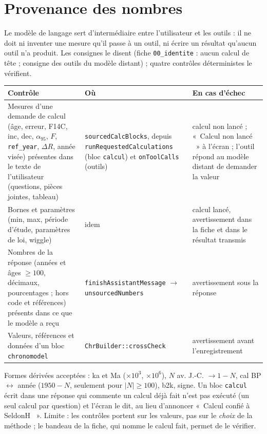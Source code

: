 \documentclass[11pt,a4paper]{article}
\providecommand{\og}{«~}\providecommand{\fg}{\unskip~»}
\newcommand{\code}[1]{\texttt{\small #1}}
\begin{document}
\section{Provenance des nombres}\label{sec:provenance}

Le modèle de langage sert d'intermédiaire entre l'utilisateur et les outils : il ne doit ni inventer une mesure qu'il
passe à un outil, ni écrire un résultat qu'aucun outil n'a produit. Les consignes le disent (fiche \code{00\_identite} :
aucun calcul de tête ; consigne des outils du modèle distant) ; quatre contrôles déterministes le vérifient.

\begin{center}\small
\begin{tabularx}{\linewidth}{@{}>{\raggedright\arraybackslash}p{4.6cm}>{\raggedright\arraybackslash}p{4.4cm}X@{}}
\toprule
\textbf{Contrôle} & \textbf{Où} & \textbf{En cas d'échec}\\
\midrule
Mesures d'une demande de calcul (âge, erreur, F14C, inc, dec, $\alpha_{95}$, $F$, \code{ref\_year}, $\Delta R$, année
visée) présentes dans le texte de l'utilisateur (questions, pièces jointes, tableau)
  & \code{sourcedCalcBlocks}, depuis \code{runRequestedCalculations} (bloc \code{calcul}) et \code{onToolCalls} (outils)
  & calcul non lancé ; \og Calcul non lancé \fg{} à l'écran ; l'outil répond au modèle distant de demander la valeur\\
Bornes et paramètres (min, max, période d'étude, paramètres de loi, wiggle) & idem
  & calcul lancé, avertissement dans la fiche et dans le résultat transmis\\
Nombres de la réponse (années et âges $\geq 100$, décimaux, pourcentages ; hors code et références)
  présents dans ce que le modèle a reçu & \code{finishAssistantMessage} $\to$ \code{unsourcedNumbers}
  & avertissement sous la réponse\\
Valeurs, références et données d'un bloc \code{chronomodel} & \code{ChrBuilder::crossCheck} & avertissement avant
  l'enregistrement\\
\bottomrule
\end{tabularx}
\end{center}

Formes dérivées acceptées : ka et Ma ($\times10^3$, $\times10^6$), $N$ av. J.-C. $\to 1-N$, cal BP $\leftrightarrow$
année ($1950-N$, seulement pour $|N|\geq100$), b2k, signe. Un bloc \code{calcul} écrit dans une réponse qui commente un
calcul déjà fait n'est pas exécuté (un seul calcul par question) et l'écran le dit, au lieu d'annoncer \og Calcul
confié à SeldonH \fg. Limite : les contrôles portent sur les valeurs, pas sur le \emph{choix} de la méthode ; le
bandeau de la fiche, qui nomme le calcul fait, permet de le vérifier.
\end{document}
